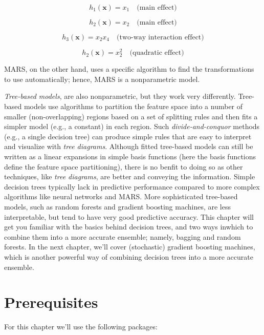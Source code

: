 \documentclass[]{book}
\theoremstyle{definition}
\theoremstyle{definition}
\theoremstyle{definition}
\theoremstyle{remark}
\begin{document}
\[h_1\left(\boldsymbol{x}\right) = x_1 \quad \text{(main effect})\]

\[h_2\left(\boldsymbol{x}\right) = x_2 \quad \text{(main effect})\]

\[h_3\left(\boldsymbol{x}\right) = x_2x_4 \quad \text{(two-way interaction effect)}\]

\[h_2\left(\boldsymbol{x}\right) = x_2^2 \quad \text{(quadratic effect})\]

MARS, on the other hand, uses a specific algorithm to find the
transformations to use automatically; hence, MARS is a nonparametric
model.

\emph{Tree-based models}, are also nonparametric, but they work very
differently. Tree-based models use algorithms to partition the feature
space into a number of smaller (non-overlapping) regions based on a set
of splitting rules and then fits a simpler model (e.g., a constant) in
each region. Such \emph{divide-and-conquor} methods (e.g., a single
decision tree) can produce simple rules that are easy to interpret and
visualize with \emph{tree diagrams}. Although fitted tree-based models
can still be written as a linear expansions in simple basis functions
(here the basis functions define the feature space partitioning), there
is no benfit to doing so as other techniques, like \emph{tree diagrams},
are better and conveying the information. Simple decision trees
typically lack in predictive performance compared to more complex
algorithms like neural networks and MARS. More sophisticated tree-based
models, such as random forests and gradient boosting machines, are less
interpretable, but tend to have very good predictive accuracy. This
chapter will get you familiar with the basics behind decision trees, and
two ways inwhich to combine them into a more accurate ensemble; namely,
bagging and random forests. In the next chapter, we'll cover
(stochastic) gradient boosting machines, which is another powerful way
of combining decision trees into a more accurate ensemble.

\hypertarget{prerequisites-7}{%
\section{Prerequisites}\label{prerequisites-7}}

For this chapter we'll use the following packages:
\end{document}
